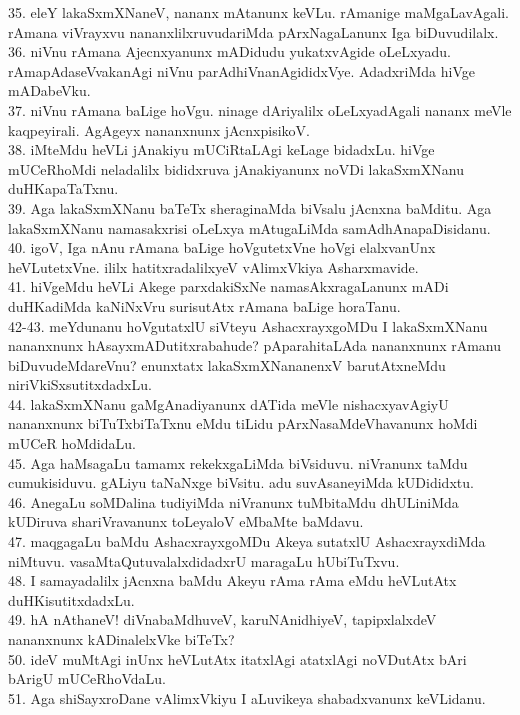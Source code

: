 \documentclass{article}
\begin{document}
35. eleY lakaSxmXNaneV, nananx mAtanunx keVLu. rAmanige maMgaLavAgali. rAmana viVrayxvu nananxlilxruvudariMda pArxNagaLanunx Iga biDuvudilalx.\\
36. niVnu rAmana Ajecnxyanunx mADidudu yukatxvAgide oLeLxyadu. rAmapAdaseVvakanAgi niVnu parAdhiVnanAgididxVye. AdadxriMda hiVge mADabeVku.\\
37. niVnu rAmana baLige hoVgu. ninage dAriyalilx oLeLxyadAgali nananx meVle kaqpeyirali. AgAgeyx nananxnunx jAcnxpisikoV.\\
38. iMteMdu heVLi jAnakiyu mUCiRtaLAgi keLage bidadxLu. hiVge mUCeRhoMdi neladalilx bididxruva jAnakiyanunx noVDi lakaSxmXNanu duHKapaTaTxnu.\\
39. Aga lakaSxmXNanu baTeTx sheraginaMda biVsalu jAcnxna baMditu. Aga lakaSxmXNanu namasakxrisi oLeLxya mAtugaLiMda samAdhAnapaDisidanu.\\
40. igoV, Iga nAnu rAmana baLige hoVgutetxVne hoVgi elalxvanUnx heVLutetxVne. ililx hatitxradalilxyeV vAlimxVkiya Asharxmavide.\\
41. hiVgeMdu heVLi Akege parxdakiSxNe namasAkxragaLanunx mADi duHKadiMda kaNiNxVru surisutAtx rAmana baLige horaTanu.\\
42-43. meYdunanu hoVgutatxlU siVteyu AshacxrayxgoMDu I lakaSxmXNanu nananxnunx hAsayxmADutitxrabahude? pAparahitaLAda nananxnunx rAmanu biDuvudeMdareVnu? enunxtatx lakaSxmXNananenxV barutAtxneMdu niriVkiSxsutitxdadxLu.\\
44. lakaSxmXNanu gaMgAnadiyanunx dATida meVle nishacxyavAgiyU nananxnunx biTuTxbiTaTxnu eMdu tiLidu pArxNasaMdeVhavanunx hoMdi mUCeR hoMdidaLu.\\
45. Aga haMsagaLu tamamx rekekxgaLiMda biVsiduvu. niVranunx taMdu cumukisiduvu. gALiyu taNaNxge biVsitu. adu suvAsaneyiMda kUDididxtu.\\
46. AnegaLu soMDalina tudiyiMda niVranunx tuMbitaMdu dhULiniMda kUDiruva shariVravanunx toLeyaloV eMbaMte baMdavu.\\
47. maqgagaLu baMdu AshacxrayxgoMDu Akeya sutatxlU AshacxrayxdiMda niMtuvu. vasaMtaQutuvalalxdidadxrU maragaLu hUbiTuTxvu.\\
48. I samayadalilx jAcnxna baMdu Akeyu rAma rAma eMdu heVLutAtx duHKisutitxdadxLu.\\
49. hA nAthaneV! diVnabaMdhuveV, karuNAnidhiyeV, tapipxlalxdeV nananxnunx kADinalelxVke biTeTx?\\
50. ideV muMtAgi inUnx heVLutAtx itatxlAgi atatxlAgi noVDutAtx bAri bArigU mUCeRhoVdaLu.\\
51. Aga shiSayxroDane vAlimxVkiyu I aLuvikeya shabadxvanunx keVLidanu.\\
\end{document}
